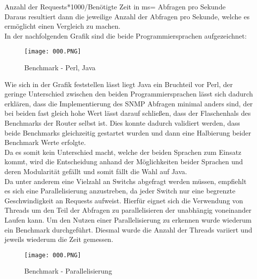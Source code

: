 Anzahl der Requests*1000/Benötigte Zeit in ms= Abfragen pro Sekunde\\

Daraus resultiert dann die jeweilige Anzahl der Abfragen pro Sekunde, welche es ermöglicht einen Vergleich zu machen.\\

In der nachfolgenden Grafik sind die beide Programmiersprachen aufgezeichnet:\\

\begin{figure}[H]
\centering
\texttt{[image: 000.PNG]}
\caption{Benchmark - Perl, Java}
\label{fig:benchperljava}
\end{figure}

Wie sich in der Grafik feststellen lässt liegt Java ein Bruchteil vor Perl, der geringe Unterschied zwischen den beiden Programmiersprachen lässt sich dadurch erklären, dass die Implementierung des SNMP Abfragen minimal anders sind, der bei beiden fast gleich hohe Wert lässt darauf schließen, dass der Flaschenhals des Benchmarks der Router selbst ist. Dies konnte dadurch validiert werden, dass beide Benchmarks  gleichzeitig gestartet wurden und dann eine Halbierung beider Benchmark Werte erfolgte.\\
Da es somit kein Unterschied macht, welche der beiden Sprachen zum Einsatz kommt, wird die Entscheidung anhand der Möglichkeiten beider Sprachen und deren Modularität gefällt und somit fällt die Wahl auf Java.\\

Da unter anderem eine Vielzahl an Switchs abgefragt werden müssen, empfiehlt es sich eine Parallelisierung anzustreben, da jeder Switch nur eine begrenzte Geschwindigkeit an Requests aufweist. Hierfür eignet sich die Verwendung von Threads um den Teil der Abfragen zu parallelisieren der unabhängig voneinander Laufen kann. Um den Nutzen einer Parallelisierung zu erkennen wurde wiederum ein Benchmark durchgeführt. Diesmal wurde die Anzahl der Threads variiert und jeweils wiederum die Zeit gemessen.\\

\begin{figure}[H]
\centering
\texttt{[image: 000.PNG]}
\caption{Benchmark - Parallelisierung}
\label{fig:benchparallel}
\end{figure}

